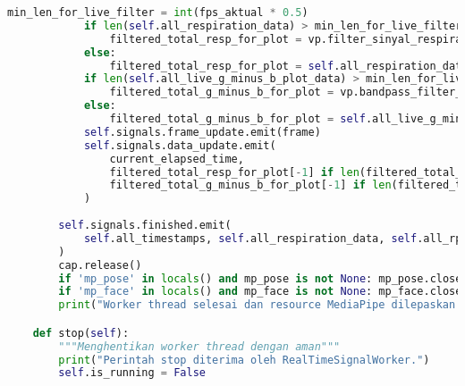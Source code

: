 \documentclass[11pt,a4paper]{article}
\begin{document}
\begin{lstlisting}[language=Python, caption=Kelas RealTimeSignalWorker,label={labelkode}]
            min_len_for_live_filter = int(fps_aktual * 0.5)
            if len(self.all_respiration_data) > min_len_for_live_filter:
                filtered_total_resp_for_plot = vp.filter_sinyal_respirasi(self.all_respiration_data, fps_aktual)
            else:
                filtered_total_resp_for_plot = self.all_respiration_data 
            if len(self.all_live_g_minus_b_plot_data) > min_len_for_live_filter:
                filtered_total_g_minus_b_for_plot = vp.bandpass_filter_rppg(self.all_live_g_minus_b_plot_data, fps_aktual, lowcut=0.7, highcut=2.5)
            else:
                filtered_total_g_minus_b_for_plot = self.all_live_g_minus_b_plot_data 
            self.signals.frame_update.emit(frame) 
            self.signals.data_update.emit(
                current_elapsed_time, 
                filtered_total_resp_for_plot[-1] if len(filtered_total_resp_for_plot) > 0 else 0.0, 
                filtered_total_g_minus_b_for_plot[-1] if len(filtered_total_g_minus_b_for_plot) > 0 else 0.0
            )
            
        self.signals.finished.emit(
            self.all_timestamps, self.all_respiration_data, self.all_rppg_rgb_data, self.all_live_g_minus_b_plot_data 
        )
        cap.release()
        if 'mp_pose' in locals() and mp_pose is not None: mp_pose.close()
        if 'mp_face' in locals() and mp_face is not None: mp_face.close()
        print("Worker thread selesai dan resource MediaPipe dilepaskan.")

    def stop(self):
        """Menghentikan worker thread dengan aman"""
        print("Perintah stop diterima oleh RealTimeSignalWorker.")
        self.is_running = False
    \end{lstlisting}
\end{document}
